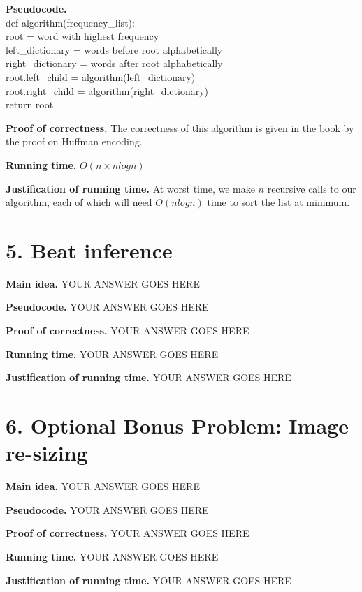 \documentclass[11pt]{article}
\begin{document}
\noindent
\textbf{Pseudocode.}\\
def algorithm(frequency\_list): \\
\indent root = word with highest frequency \\
\indent left\_dictionary = words before root alphabetically \\
\indent right\_dictionary = words after root alphabetically \\
\indent root.left\_child = algorithm(left\_dictionary) \\
\indent root.right\_child = algorithm(right\_dictionary) \\
\indent return root

\noindent
\textbf{Proof of correctness.}
The correctness of this algorithm is given in the book by the proof on Huffman encoding.


\noindent
\textbf{Running time.}
$O(n\times nlogn)$


\noindent
\textbf{Justification of running time.}
At worst time, we make $n$ recursive calls to our algorithm, each of which will need $O(n log n)$ time to sort the list at minimum.


\newpage
\section*{5. Beat inference}
\noindent
\textbf{Main idea.}
YOUR ANSWER GOES HERE


\noindent
\textbf{Pseudocode.}
YOUR ANSWER GOES HERE

\noindent
\textbf{Proof of correctness.}
YOUR ANSWER GOES HERE


\noindent
\textbf{Running time.}
YOUR ANSWER GOES HERE


\noindent
\textbf{Justification of running time.}
YOUR ANSWER GOES HERE


\newpage
\section*{6. Optional Bonus Problem: Image re-sizing}
\noindent
\textbf{Main idea.}
YOUR ANSWER GOES HERE


\noindent
\textbf{Pseudocode.}
YOUR ANSWER GOES HERE

\noindent
\textbf{Proof of correctness.}
YOUR ANSWER GOES HERE


\noindent
\textbf{Running time.}
YOUR ANSWER GOES HERE


\noindent
\textbf{Justification of running time.}
YOUR ANSWER GOES HERE
\end{document}
